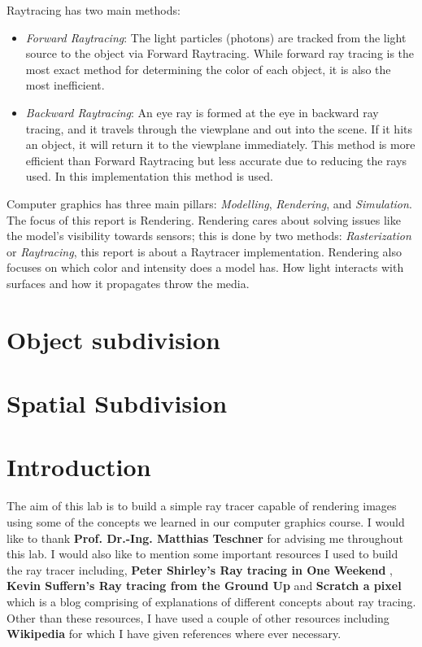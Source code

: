 \documentclass[11pt,a4paper]{article}
\begin{document}
	\vspace*{5px}
	Raytracing has two main methods: 
	\begin{itemize}
		\item 		\textit{Forward Raytracing}: The light particles (photons) are tracked from the light source to the object via Forward Raytracing. While forward ray tracing is the most exact method for determining the color of each object, it is also the most inefficient.
		\item 		\textit{Backward Raytracing}: 
		An eye ray is formed at the eye in backward ray tracing, and it travels through the viewplane and out into the scene. If it hits an object, it will return it to the viewplane immediately. This method is more efficient than Forward Raytracing but less accurate due to reducing the rays used. In this implementation this method is used.
	\end{itemize}

		Computer graphics has three main pillars: \textit{Modelling}, \textit{Rendering}, and \textit{Simulation}. The focus of this report is Rendering. Rendering cares about solving issues like the model's visibility towards sensors; this is done by two methods: \textit{Rasterization} or \textit{Raytracing}, this report is about a Raytracer implementation. Rendering also focuses on which color and intensity does a model has. How light interacts with surfaces and how it propagates throw the media.
	\section{Object subdivision}
	\section{Spatial Subdivision}
	
	
	\section{Introduction}
	The aim of this lab is to build a simple ray tracer capable of rendering images using some of the concepts we learned in our computer graphics course. I would like to thank \textbf{Prof. Dr.-Ing. Matthias Teschner} for advising me throughout this lab. I would also like to mention some important resources I used to build the ray tracer including, \textbf{Peter Shirley's Ray tracing in One Weekend} \cite{Shirley2020RTW1}, \textbf{Kevin Suffern's Ray tracing from the Ground Up} \cite{suffern2016ray} and \textbf{Scratch a pixel} \cite{scratchapixel} which is a blog comprising of explanations of different concepts about ray tracing. Other than these resources, I have used a couple of other resources including \textbf{Wikipedia} for which I have given references where ever necessary.
	
\end{document}
